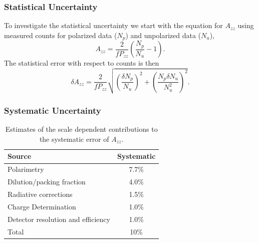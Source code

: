 

\subsubsection{Statistical Uncertainty}
\label{stat}
To investigate the statistical uncertainty we start with the equation for $A_{zz}$ using
measured counts for polarized data ($N_p$) and unpolarized data ($N_u$), 
\begin{equation}
A_{zz}=\frac{2}{fP_{zz}}\left(\frac{N_p}{N_u}-1\right).
\end{equation}
The statistical error with respect to counts is then
\begin{equation}
\delta A_{zz}=\frac{2}{fP_{zz}}\sqrt{\left(\frac{\delta N_p}{N_u}\right)^2+\left(\frac{N_p\delta N_u}{N_u^2}\right)^2}.
\end{equation}


\subsubsection{Systematic Uncertainty}%
\begin{table}
\begin{center}
\begin{tabular}{l|c}\hline\hline
Source                         & Systematic \\
\hline
Polarimetry                  &   7.7\%   \\
Dilution/packing fraction    &   4.0\%   \\
Radiative corrections        &   1.5\%   \\
Charge Determination           &  1.0\%  \\
Detector resolution and efficiency & 1.0\% \\
\hline
Total  &  10\%   \\
\hline
\end{tabular}
\caption{\label{error1}Estimates of the scale dependent contributions to the systematic error of $A_{zz}$.}
\end{center}
\end{table}



